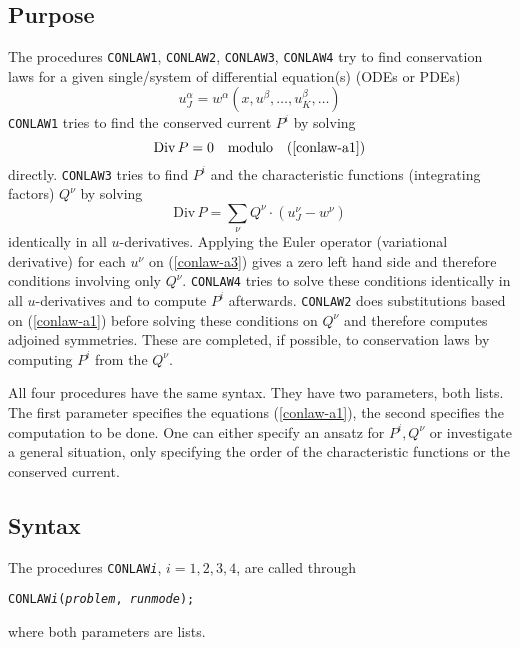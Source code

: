 \subsection{Purpose}

The procedures \texttt{CONLAW1}, \texttt{CONLAW2}, \texttt{CONLAW3},
\texttt{CONLAW4} try to find conservation laws for a given
single/system of differential equation(s) (ODEs or PDEs)
\begin{equation}
     u^{\alpha}_J = w^{\alpha}(x,u^{\beta},\ldots,u^{\beta}_K,\ldots) \label{conlaw-a1}
\end{equation}
\texttt{CONLAW1} tries to find the conserved current $P^i$ by solving
\begin{equation}
   \text{Div}\,P = 0 \quad \text{modulo} \quad (\ref{conlaw-a1})
\label{conlaw-a2}
\end{equation}
directly.  \texttt{CONLAW3} tries to find $P^i$ and the characteristic
functions (integrating factors) $Q^{\nu}$ by solving
\begin{equation}
\mbox{Div}\,P = \sum_{\nu} Q^{\nu}\cdot (u^{\nu}_J - w^{\nu}) \label{conlaw-a3}
\end{equation}
identically in all $u$-derivatives.  Applying the Euler operator
(variational derivative) for each $u^{\nu}$ on (\ref{conlaw-a3}) gives
a zero left hand side and therefore conditions involving only
$Q^{\nu}$.  \texttt{CONLAW4} tries to solve these conditions
identically in all $u$-derivatives and to compute $P^i$ afterwards.
\texttt{CONLAW2} does substitutions based on (\ref{conlaw-a1}) before
solving these conditions on $Q^{\nu}$ and therefore computes adjoined
symmetries.  These are completed, if possible, to conservation laws by
computing $P^i$ from the $Q^{\nu}$.

All four procedures have the same syntax.  They have two parameters,
both lists.  The first parameter specifies the equations
(\ref{conlaw-a1}), the second specifies the computation to be done.
One can either specify an ansatz for $P^i, Q^{\nu}$ or investigate a
general situation, only specifying the order of the characteristic
functions or the conserved current.

\subsection{Syntax}

The procedures \texttt{CONLAW\textit{i}}, $i=1,2,3,4$, are called
through
\begin{center}
  \texttt{CONLAW\textit{i}(\textit{problem}, \textit{runmode});}
\end{center}
where both parameters are lists.

